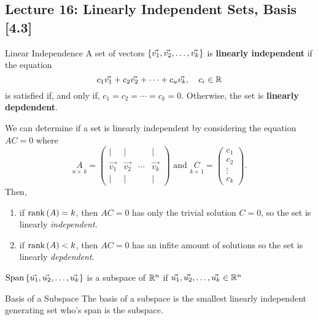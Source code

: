 \subsection{Lecture 16: Linearly Independent Sets, Basis [4.3]}
\begin{defbox}{Linear Independence}{}
    A set of vectors $\left\{\vec{v_1}, \vec{v_2}, \ldots, \vec{v_k} \right\}$ is \textbf{linearly independent} if the equation 
    \[
        c_1\vec{v_1} + c_2\vec{v_2} + \cdots + c_u\vec{v_k}, \quad c_i \in \mathbb R 
    \]
    is satisfied if, and only if, $c_1 = c_2 = \cdots = c_k = 0$. Otherwise, the set is \textbf{linearly depdendent}.
\end{defbox}

We can determine if a set is linearly independent by considering the equation $AC=0$ where 
\[
    \underset{n\times\,k}{A} = \begin{pmatrix}
        | & | & & | \\
        \vec{v_1} & \vec{v_2} & \cdots & \vec{v_k} \\
        | & | & & |
    \end{pmatrix}
    \text{ and }
    \underset{k\times\,1}{C} = \begin{pmatrix}
        c_1 \\ c_2 \\ \vdots \\ c_k
    \end{pmatrix}.
\]
Then,
\begin{enumerate}
    \item if $\text{rank}\left(A\right) = k$, then $AC = 0$ has only the trivial solution $C=0$, so the set is linearly \textit{independent}.
    \item if $\text{rank}\left(A\right) < k$, then $AC = 0$ has an infite amount of solutions so the set is linearly \textit{depdendent}.
\end{enumerate}

\begin{impbox}{}{}
    $\text{Span}\left\{\vec{u_1}, \vec{u_2}, \ldots, \vec{u_k} \right\}$ is a subspace of $\mathbb R^{n}$ if $\vec{u_1}, \vec{u_2}, \ldots, \vec{u_k} \in \mathbb R^{n}$
\end{impbox}

\begin{defbox}{Basis of a Subspace}{}
    The basis of a subspace is the smallest linearly independent generating set who's span is the subspace.
\end{defbox}

